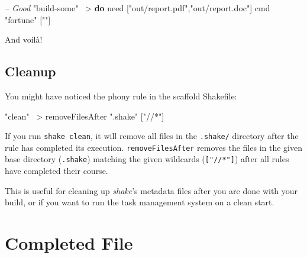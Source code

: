 \documentclass[]{article}
\newenvironment{Shaded}{}{}
\newcommand{\CommentTok}[1]{\textcolor[rgb]{0.38,0.63,0.69}{\textit{#1}}}
\newcommand{\FunctionTok}[1]{\textcolor[rgb]{0.02,0.16,0.49}{#1}}
\newcommand{\KeywordTok}[1]{\textcolor[rgb]{0.00,0.44,0.13}{\textbf{#1}}}
\newcommand{\NormalTok}[1]{#1}
\newcommand{\StringTok}[1]{\textcolor[rgb]{0.25,0.44,0.63}{#1}}
\begin{document}
\begin{Shaded}
\begin{Highlighting}[]
\CommentTok{-- Good}
\StringTok{"build-some"} \FunctionTok{~>} \KeywordTok{do}
\NormalTok{    need [}\StringTok{"out/report.pdf"}\NormalTok{,}\StringTok{"out/report.doc"}\NormalTok{]}
\NormalTok{    cmd }\StringTok{"fortune"}\NormalTok{ [}\StringTok{""}\NormalTok{]}
\end{Highlighting}
\end{Shaded}

And voilà!

\hypertarget{cleanup}{%
\subsection{Cleanup}\label{cleanup}}

You might have noticed the phony rule in the scaffold Shakefile:

\begin{Shaded}
\begin{Highlighting}[]
\StringTok{"clean"} \FunctionTok{~>}\NormalTok{ removeFilesAfter }\StringTok{".shake"}\NormalTok{ [}\StringTok{"//*"}\NormalTok{]}
\end{Highlighting}
\end{Shaded}

If you run \texttt{shake\ clean}, it will remove all files in the
\texttt{.shake/} directory after the rule has completed its execution.
\texttt{removeFilesAfter} removes the files in the given base directory
(\texttt{.shake}) matching the given wildcards (\texttt{{[}"//*"{]}}) after all
rules have completed their course.

This is useful for cleaning up \emph{shake}'s metadata files after you are done
with your build, or if you want to run the task management system on a clean
start.

\hypertarget{completed-file}{%
\section{Completed File}\label{completed-file}}
\end{document}
